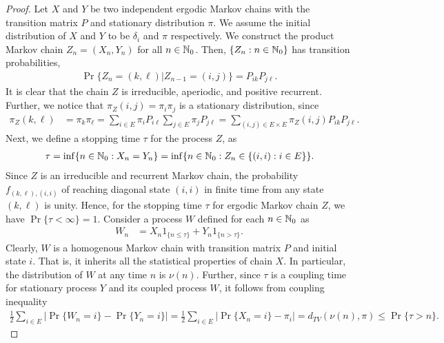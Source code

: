 \documentclass[a4paper,10pt,english]{article}
\begin{document}
\begin{proof}
Let $X$ and $Y$ be two independent ergodic Markov chains with the transition matrix $P$ and stationary distribution $\pi$. 
We assume the initial distribution of $X$ and $Y$ to be $\delta_i$ and $\pi$ respectively. 
We construct the product Markov chain $Z_n = (X_n, Y_n)$ for all $n \in \mathbb{N}_0$. 
Then, $\{Z_n: n \in \mathbb{N}_0\}$ has transition probabilities, 
\begin{align*}
\Pr\{Z_n = (k,\ell)|Z_{n-1} = (i,j)\} = P_{ik} P_{j\ell}.
\end{align*}
It is clear that the chain $Z$ is irreducible, aperiodic, and positive recurrent. 
Further, we notice that $\pi_Z(i,j) = \pi_i \pi_j$ is a stationary distribution, since
\begin{align*}
\pi_Z(k,\ell) &=  \pi_k \pi_{\ell} = \sum_{i \in E}\pi_iP_{i\ell} \sum_{j \in E}\pi_jP_{j\ell} = \sum_{(i,j) \in E \times E}\pi_Z(i,j)P_{ik}P_{j\ell}.
\end{align*}
Next, we define a stopping time $\tau$ for the process $Z$, as 
\begin{align*}
\tau = \inf\{n \in \mathbb{N}_0 : X_n = Y_n \} = \inf\{n \in \mathbb{N}_0: Z_n \in \{(i,i): i \in E\} \}.
\end{align*}
Since $Z$ is an irreducible and recurrent Markov chain, the probability $f_{(k,\ell),(i,i)}$ of reaching diagonal state $(i,i)$ in finite time from any state $(k,\ell)$ is unity. 
Hence, for the stopping time $\tau$ for ergodic Markov chain $Z$, we have $\Pr\{\tau < \infty\} = 1$. 
Consider a process $W$ defined for each $n \in \mathbb{N}_0$ as  
\begin{align*}
W_n &= X_n1_{\{ n \leq \tau\}} + Y_n1_{\{n > \tau\}}.
\end{align*}
Clearly, $W$ is a homogenous Markov chain with transition matrix $P$ and initial state $i$. 
That is, it inherits all the statistical properties of chain $X$. 
In particular, the distribution of $W$ at any time $n$ is $\nu(n)$. 
Further, since $\tau$ is a coupling time for stationary process $Y$ and its coupled process $W$, 
it follows from coupling inequality  
\begin{align*}
\frac{1}{2}\sum_{i \in E} \lvert \Pr\{W_n = i\} - \Pr\{Y_n = i\}\rvert  = \frac{1}{2}\sum_{i \in E} \lvert \Pr\{X_n = i\} - \pi_i\rvert  = d_{TV}(\nu(n), \pi )\leq \Pr\{\tau > n\}.
\end{align*}

\end{proof}
\end{document}
